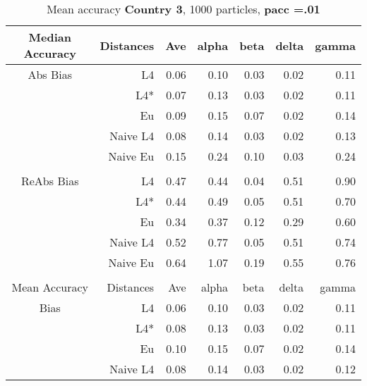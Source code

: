 \documentclass[a4paper,12pt,twoside]{book}
\begin{document}

\begin{table}[H]

\centering
\vfill
\caption{Mean  accuracy \textbf{Country 3}, 1000 particles, \textbf{pacc =.01}}


\begin{tabular}{crrrrrr}
  \hline
  
{\color{blue}Median Accuracy} & Distances & Ave & alpha & beta & delta & gamma \\ 
  \hline
{\color{blue}Abs Bias}& L4  &0.06 & 0.10 & 0.03 & 0.02 & 0.11 \\ 
 
 &L4*  &  0.07 & 0.13 & 0.03 & 0.02 & 0.11 \\ 
  
 
&Eu &   0.09 & 0.15 & 0.07 & 0.02 & 0.14 \\ 
  
 
&Naive L4&       
  0.08 & 0.14 & 0.03 & 0.02 & 0.13 \\ 

&Naive Eu &     0.15 & 0.24 & 0.10 & 0.03 & 0.24 \\ 
  \\ 
   \hline
   
{\color{blue} ReAbs Bias } & L4  &0.47 & 0.44 & 0.04 & 0.51 & 0.90 \\ 
 
&L4*  &  0.44 & 0.49 & 0.05 & 0.51 & 0.70 \\ 
  
&Eu &   
 0.34 & 0.37 & 0.12 & 0.29 & 0.60 \\ 
 
  
&Naive L4&   
 0.52 & 0.77 & 0.05 & 0.51 & 0.74 \\  
 
&Naive Eu &    0.64 & 1.07 & 0.19 & 0.55 & 0.76 \\ 
   \\ 
   \hline
{\color{blue}Mean Accuracy} & Distances & Ave & alpha & beta & delta & gamma \\ 
  \hline
{\color{blue}Bias} & L4  &0.06 & 0.10 & 0.03 & 0.02 & 0.11 \\ 
  
&L4*  &0.08 & 0.13 & 0.03 & 0.02 & 0.11 \\ 
 
  
&Eu &   0.10 & 0.15 & 0.07 & 0.02 & 0.14 \\ 
  
  
&Naive L4&  
     0.08 & 0.14 & 0.03 & 0.02 & 0.12 \\ 
  

\end{tabular}
\end{table}
\end{document}
